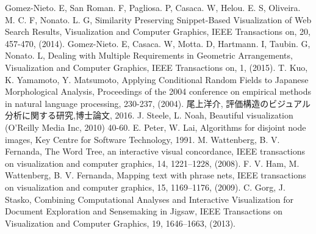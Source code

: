\documentclass[syuuron]{kuee}
\begin{document}
\begin{thebibliography}{数字}
	 Gomez-Nieto. E, San Roman. F, Pagliosa. P, Casaca. W, Helou. E. S, Oliveira. M. C. F, Nonato. L. G, Similarity Preserving Snippet-Based Visualization of Web Search Results, Visualization and Computer Graphics, IEEE Transactions on, 20, 457-470, (2014).
	 Gomez-Nieto. E, Casaca. W, Motta. D, Hartmann. I, Taubin. G, Nonato. L, Dealing with Multiple Requirements in Geometric Arrangements, Visualization and Computer Graphics, IEEE Transactions on, 1, (2015).
	 T. Kuo, K. Yamamoto, Y. Matsumoto, Applying Conditional Random Fields to Japanese Morphological Analysis, Proceedings of the 2004 conference on empirical methods in natural language processing, 230-237, (2004).
	 尾上洋介, 評価構造のビジュアル分析に関する研究,博士論文, 2016.
	 J. Steele, L. Noah, Beautiful visualization (O'Reilly Media Inc, 2010) 40-60.
	 E. Peter, W. Lai, Algorithms for disjoint node images, Key Centre for Software Technology, 1991.
	 M. Wattenberg, B. V. Fernanda, The Word Tree, an interactive visual concordance, IEEE transactions on visualization and computer graphics, 14, 1221–1228, (2008).
	 F. V. Ham, M. Wattenberg, B. V. Fernanda, Mapping text with phrase nets, IEEE transactions on visualization and computer graphics, 15, 1169–1176, (2009).
	 C. Gorg, J. Stasko, Combining Computational Analyses and Interactive Visualization for Document Exploration and Sensemaking in Jigsaw, IEEE Transactions on Visualization and Computer Graphics, 19, 1646–1663, (2013).
\end{thebibliography}

\appendix
\end{document}

